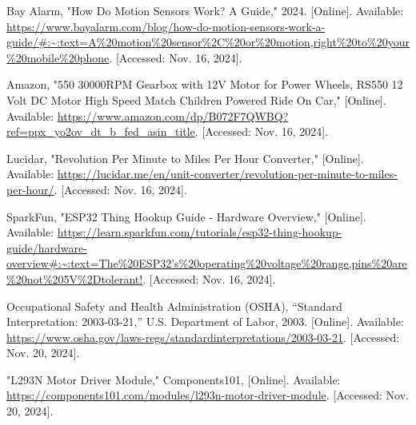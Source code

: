\begin{thebibliography}{45}
	 Bay Alarm, "How Do Motion Sensors Work? A Guide," 2024. [Online]. Available: \url{https://www.bayalarm.com/blog/how-do-motion-sensors-work-a-guide/#:~:text=A%20motion%20sensor%2C%20or%20motion,right%20to%20your%20mobile%20phone}. [Accessed: Nov. 16, 2024]. 
	
	Amazon, "550 30000RPM Gearbox with 12V Motor for Power Wheels, RS550 12 Volt DC Motor High Speed Match Children Powered Ride On Car," [Online]. Available: \url{https://www.amazon.com/dp/B072F7QWBQ?ref=ppx_yo2ov_dt_b_fed_asin_title}. [Accessed: Nov. 16, 2024].
	
	Lucidar, "Revolution Per Minute to Miles Per Hour Converter," [Online]. Available: \url{https://lucidar.me/en/unit-converter/revolution-per-minute-to-miles-per-hour/}. [Accessed: Nov. 16, 2024].
	
	SparkFun, "ESP32 Thing Hookup Guide - Hardware Overview," [Online]. Available: \url{https://learn.sparkfun.com/tutorials/esp32-thing-hookup-guide/hardware-overview#:~:text=The%20ESP32's%20operating%20voltage%20range,pins%20are%20not%205V%2Dtolerant!}. [Accessed: Nov. 16, 2024].
	
	Occupational Safety and Health Administration (OSHA), ``Standard Interpretation: 2003-03-21,'' U.S. Department of Labor, 2003. [Online]. Available: \url{https://www.osha.gov/laws-regs/standardinterpretations/2003-03-21}. [Accessed: Nov. 20, 2024].
	
	"L293N Motor Driver Module," Components101, [Online]. Available: \url{https://components101.com/modules/l293n-motor-driver-module}. [Accessed: Nov. 20, 2024].
	
	
\end{thebibliography}
